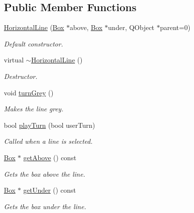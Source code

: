 \subsection*{\-Public \-Member \-Functions}
\begin{DoxyCompactItemize}
\item 
\hyperlink{classHorizontalLine_ad74caf3817002a674c7e8e813bb3fb73}{\-Horizontal\-Line} (\hyperlink{classBox}{\-Box} $\ast$above, \hyperlink{classBox}{\-Box} $\ast$under, \-Q\-Object $\ast$parent=0)
\begin{DoxyCompactList}\small\item\em \-Default constructor. \end{DoxyCompactList}\item 
virtual \hyperlink{classHorizontalLine_a466f8a4e47a315d901cef8b3b1856366}{$\sim$\-Horizontal\-Line} ()
\begin{DoxyCompactList}\small\item\em \-Destructor. \end{DoxyCompactList}\item 
void \hyperlink{classHorizontalLine_ae4b1b9f4b9de1e4393868675813fbf8c}{turn\-Grey} ()
\begin{DoxyCompactList}\small\item\em \-Makes the line grey. \end{DoxyCompactList}\item 
bool \hyperlink{classHorizontalLine_aefd796758e374952b730268387f134e6}{play\-Turn} (bool user\-Turn)
\begin{DoxyCompactList}\small\item\em \-Called when a line is selected. \end{DoxyCompactList}\item 
\hyperlink{classBox}{\-Box} $\ast$ \hyperlink{classHorizontalLine_ad2289edae1e1ce26630d0215578ae5b6}{get\-Above} () const 
\begin{DoxyCompactList}\small\item\em \-Gets the box above the line. \end{DoxyCompactList}\item 
\hyperlink{classBox}{\-Box} $\ast$ \hyperlink{classHorizontalLine_aafd04b01e9a589e429b3bfd500c1ff2e}{get\-Under} () const 
\begin{DoxyCompactList}\small\item\em \-Gets the box under the line. \end{DoxyCompactList}\end{DoxyCompactItemize}


